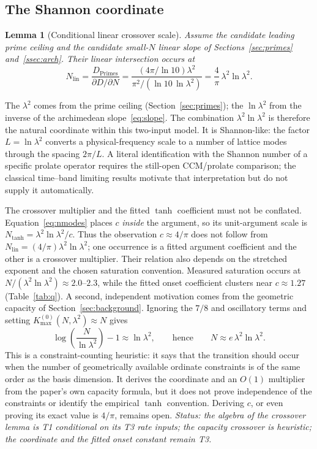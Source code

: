 \documentclass[11pt,a4paper]{article}
\newtheorem{lemma}{Lemma}
\begin{document}
\subsection{The Shannon coordinate}\label{ssec:coord}

\begin{lemma}[Conditional linear crossover scale]\label{lem:coord}
Assume the candidate leading prime ceiling and the candidate small-$N$ linear
slope of Sections~\ref{sec:primes} and~\ref{ssec:arch}. Their linear
intersection occurs at
\[
  N_{\mathrm{lin}}=\frac{D_{\mathrm{Primes}}}{\partial D/\partial N}
  =\frac{(4\pi/\ln10)\lambda^2}{\pi^2/(\ln10\,\ln\lambda^2)}
  =\frac{4}{\pi}\,\lambda^2\ln\lambda^2 .
\]
\end{lemma}

The $\lambda^2$ comes from the prime ceiling (Section~\ref{sec:primes}); the
$\ln\lambda^2$ from the inverse of the archimedean slope~\eqref{eq:slope}.
The combination $\lambda^2\ln\lambda^2$ is therefore the natural coordinate
within this two-input model. It is Shannon-like: the factor
$L=\ln\lambda^2$ converts a physical-frequency scale to a number of lattice
modes through the spacing $2\pi/L$. A literal identification with the Shannon
number of a specific prolate operator requires the still-open CCM/prolate
comparison; the classical time--band limiting results
\cite{LandauPollak1962,SlepianPollak1961,LandauWidom1980} motivate that
interpretation but do not supply it automatically.

The crossover multiplier and the fitted $\tanh$ coefficient must not be
conflated. Equation~\eqref{eq:nmodes} places $c$ \emph{inside} the argument, so
its unit-argument scale is
$N_{\tanh}=\lambda^2\ln\lambda^2/c$. Thus the observation
$c\approx4/\pi$ does not follow from
$N_{\mathrm{lin}}=(4/\pi)\lambda^2\ln\lambda^2$; one occurrence is a fitted
argument coefficient and the other is a crossover multiplier. Their relation
also depends on the stretched exponent and the chosen saturation convention.
Measured saturation occurs at
$N/(\lambda^2\ln\lambda^2)\approx2.0$--$2.3$, while the fitted onset
coefficient clusters near $c\approx1.27$ (Table~\ref{tab:q}). A second,
independent motivation comes from the geometric capacity of
Section~\ref{sec:background}. Ignoring the $7/8$ and oscillatory terms and
setting $K_{\max}^{(0)}(N,\lambda^2)\approx N$ gives
\[
 \log\!\left(\frac{N}{\ln\lambda^2}\right)-1\approx\ln\lambda^2,
 \qquad\text{hence}\qquad
 N\approx e\,\lambda^2\ln\lambda^2.
\]
This is a constraint-counting heuristic: it says that the transition should
occur when the number of geometrically available ordinate constraints is of
the same order as the basis dimension. It derives the coordinate and an
$O(1)$ multiplier from the paper's own capacity formula, but it does not prove
independence of the constraints or identify the empirical $\tanh$ convention.
Deriving $c$, or even proving its exact value is $4/\pi$, remains open.
\emph{Status: the algebra of the crossover lemma is T1 conditional on its T3
rate inputs; the capacity crossover is heuristic; the coordinate and the
fitted onset constant remain T3.}
\end{document}
